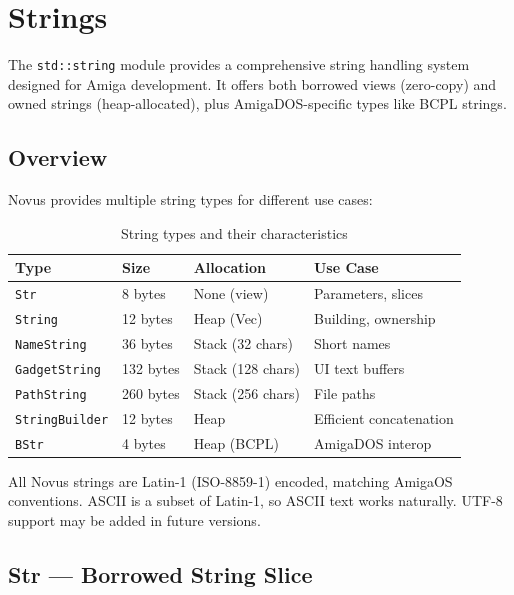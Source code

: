 \chapter{Strings}
\label{chap:strings}

The \texttt{std::string} module provides a comprehensive string handling system designed for Amiga development. It offers both borrowed views (zero-copy) and owned strings (heap-allocated), plus AmigaDOS-specific types like BCPL strings.

\section{Overview}

Novus provides multiple string types for different use cases:

\begin{table}[h]
\centering
\begin{tabular}{llll}
\textbf{Type} & \textbf{Size} & \textbf{Allocation} & \textbf{Use Case} \\
\hline
\texttt{Str} & 8 bytes & None (view) & Parameters, slices \\
\texttt{String} & 12 bytes & Heap (Vec) & Building, ownership \\
\texttt{NameString} & 36 bytes & Stack (32 chars) & Short names \\
\texttt{GadgetString} & 132 bytes & Stack (128 chars) & UI text buffers \\
\texttt{PathString} & 260 bytes & Stack (256 chars) & File paths \\
\texttt{StringBuilder} & 12 bytes & Heap & Efficient concatenation \\
\texttt{BStr} & 4 bytes & Heap (BCPL) & AmigaDOS interop \\
\end{tabular}
\caption{String types and their characteristics}
\end{table}

\begin{notebox}
All Novus strings are Latin-1 (ISO-8859-1) encoded, matching AmigaOS conventions. ASCII is a subset of Latin-1, so ASCII text works naturally. UTF-8 support may be added in future versions.
\end{notebox}

\section{Str --- Borrowed String Slice}
\label{sec:str}

